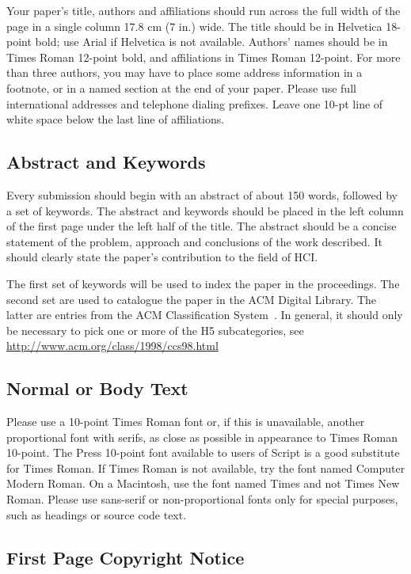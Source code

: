 \documentclass{sigchi}
\begin{document}
Your paper's title, authors and affiliations should run across the
full width of the page in a single column 17.8 cm (7 in.) wide. The
title should be in Helvetica 18-point bold; use Arial if Helvetica is
not available. Authors' names should be in Times Roman 12-point bold,
and affiliations in Times Roman 12-point. For more than three authors,
you may have to place some address information in a footnote, or in a named
section at the end of your paper. Please use full international addresses and
telephone dialing prefixes. Leave one 10-pt line of white space below the last
line of affiliations.

\subsection{Abstract and Keywords}

Every submission should begin with an abstract of about 150 words,
followed by a set of keywords. The abstract and keywords should be
placed in the left column of the first page under the left half of the
title. The abstract should be a concise statement of the problem,
approach and conclusions of the work described. It should clearly
state the paper's contribution to the field of HCI.

The first set of keywords will be used to index the paper in the
proceedings. The second set are used to catalogue the paper in the ACM
Digital Library. The latter are entries from the ACM Classification
System~\cite{acm_categories}. In general, it should only be necessary
to pick one or more of the H5 subcategories, see
\url{http://www.acm.org/class/1998/ccs98.html}

\subsection{Normal or Body Text}

Please use a 10-point Times Roman font or, if this is unavailable,
another proportional font with serifs, as close as possible in
appearance to Times Roman 10-point. The Press 10-point font available
to users of Script is a good substitute for Times Roman. If Times
Roman is not available, try the font named Computer Modern Roman. On a
Macintosh, use the font named Times and not Times New Roman. Please
use sans-serif or non-proportional fonts only for special purposes,
such as headings or source code text.

\subsection{First Page Copyright Notice}
\end{document}
